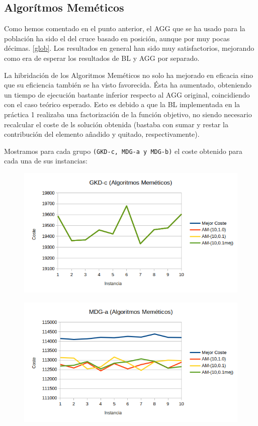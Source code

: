 \newpage 
\subsection{Algorítmos Meméticos}

Como hemos comentado en el punto anterior, el AGG que se ha usado para la población ha sido el del cruce basado en posición, aunque por muy pocas décimas. \ref{glob}. Los resultados en general han sido muy satisfactorios, mejorando como era de esperar los resultados de BL y AGG por separado.


La hibridación de los Algoritmos Meméticos no solo ha mejorado en eficacia sino que su eficiencia también se ha visto favorecida. Ésta ha aumentado, obteniendo un tiempo de ejecución bastante inferior respecto al AGG original, coincidiendo con el caso teórico esperado. Esto es debido a que la BL implementada en la práctica 1 realizaba una factorización de la función objetivo, no siendo necesario recalcular el coste de ls solución obtenida (bastaba con sumar y restar la contribución del elemento añadido y quitado, respectivamente). 



Mostramos para cada grupo \texttt{(GKD-c, MDG-a y MDG-b)} el coste obtenido para cada una de sus instancias:


\begin{figure}[H]
	\centering
	\includegraphics[scale=0.6]{img/amc.png}
\end{figure}

\begin{figure}[H]
	\centering
	\includegraphics[scale=0.6]{img/ama.png}
\end{figure}

